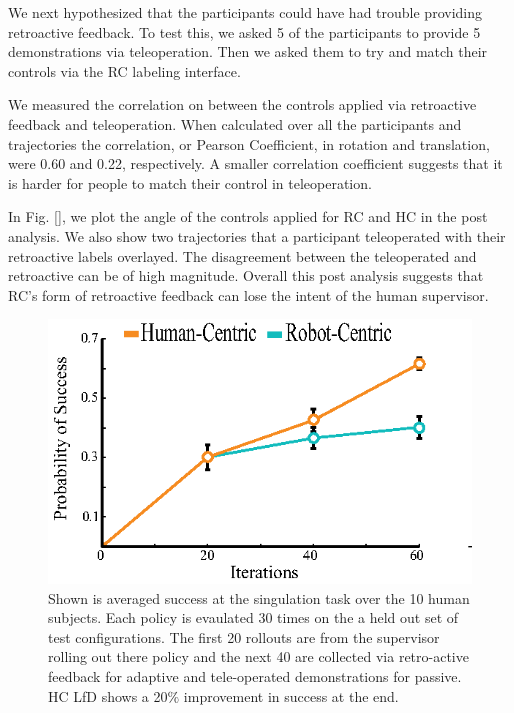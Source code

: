 \documentclass[10pt, conference]{ieeeconf}      %
\begin{document}
We next hypothesized that the participants could have had trouble providing retroactive feedback. To test this, we asked 5 of the participants to provide 5 demonstrations via teleoperation. Then we asked them to try and match their controls via the RC labeling interface. 

We measured the correlation on between the controls applied via retroactive feedback and teleoperation. When calculated over all the participants and trajectories the correlation, or Pearson Coefficient, in rotation and translation, were 0.60 and 0.22, respectively. A smaller correlation coefficient suggests that it is harder for people to match their control in teleoperation. 

In Fig. \ref{}, we plot the angle of the controls applied for RC and HC in the post analysis. We also show two trajectories that a participant teleoperated with their retroactive labels overlayed. The disagreement between the teleoperated and retroactive can be of high magnitude. Overall this post analysis suggests that RC's form of retroactive feedback can lose the intent of the human supervisor. 


\begin{figure}
\centering
\includegraphics{f_figs/izzy_reward.eps}
\caption{
    \footnotesize
Shown is averaged success at the singulation task over the 10 human subjects. Each policy is evaulated 30 times on the a held out set of test configurations. The first 20 rollouts are from the supervisor rolling out there policy and the next 40 are collected via retro-active feedback for adaptive and tele-operated demonstrations for passive. HC LfD shows a 20$\%$ improvement in success at the end. }

\label{fig:izzy_rw}
\end{figure}
\end{document}
